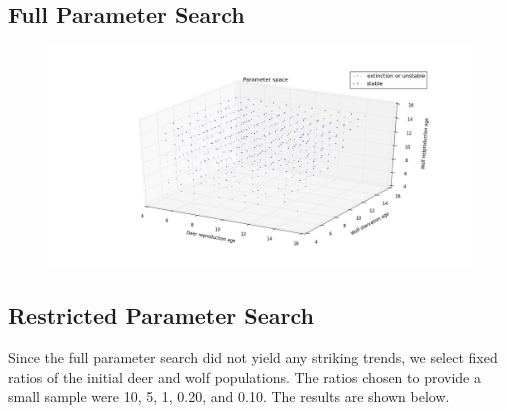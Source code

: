 \documentclass[a4paper,12pt]{article}
\begin{document}
\subsection{Full Parameter Search}
\begin{figure}
	\includegraphics[width = 1\textwidth]{./pics/Eco_All_param_front.png}
\end{figure}
\subsection{Restricted Parameter Search}
\indent
\indent Since the full parameter search did not yield any striking trends, we select fixed ratios of the initial deer and wolf populations.  The ratios chosen to provide 
a small sample were 10, 5, 1, 0.20, and 0.10. The results are shown below.
\end{document}
